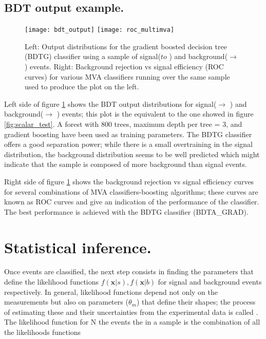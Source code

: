 \subsection{BDT output example.}

\begin{figure}[!h]
  \centering
  \texttt{[image: bdt\_output]}
  \texttt{[image: roc\_multimva]}
  \caption[BDT output example.]{Left: Output distributions for the gradient boosted decision tree (BDTG) classifier using a sample of signal(\pp $to$ \tHq ) and background(\pp $\to$ \ttbar) events. Right: Background rejection vs signal efficiency (ROC curves) for various MVA classifiers running over the same sample used to produce the plot on the left.}\label{fig:bdt_output}
\end{figure}


Left side of figure \ref{fig:bdt_output} shows the BDT output distributions for signal(\pp $\to$ \tHq ) and background(\pp $\to$ \ttbar) events; this plot is the equivalent to the one showed in figure \ref{fig:scalar_test}. A forest with 800 trees, maximum depth per tree = 3, and gradient boosting have been used as training parameters. The BDTG classifier offers a good separation power; while there is a small overtraining in the signal distribution, the background distribution seems to be well predicted which might indicate that the sample is composed of more background than signal events.

Right side of figure \ref{fig:bdt_output} shows the background rejection vs signal efficiency curves for several combinations of MVA classifiers-boosting algorithms; these curves are known as ROC curves and give an indication of the performance of the classifier. The best performance is achieved with the BDTG classifier (BDTA\_GRAD).   


\section{Statistical inference.}

Once events are classified, the next step consists in finding the parameters that define the likelihood functions $f(\textbf{x}|s), f(\textbf{x}|b)$ for signal and background events respectively. In general, likelihood functions depend not only on the measurements but also on parameters ($\theta_m$) that define their shapes; the process of estimating these  and their uncertainties from the experimental data is called . The likelihood function for N the events the in a sample is the combination of all the likelihoods functions

